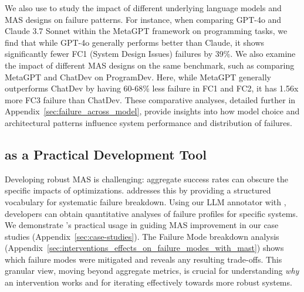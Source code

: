 We also use \dataset{} to study the impact of different underlying language models and MAS designs on failure patterns. For instance, when comparing GPT-4o and Claude 3.7 Sonnet within the MetaGPT framework on programming tasks, we find that while GPT-4o generally performs better than Claude, it shows significantly fewer FC1 (System Design Issues) failures by 39\%. We also examine the impact of different MAS designs on the same benchmark, such as comparing MetaGPT and ChatDev on ProgramDev. Here, while MetaGPT generally outperforms ChatDev by having 60-68\% less failure in FC1 and FC2, it has 1.56x more FC3 failure than ChatDev. These comparative analyses, detailed further in Appendix~\ref{sec:failure_across_model}, provide insights into how model choice and architectural patterns influence system performance and distribution of failures.

\subsection{\taxonomy{} as a Practical Development Tool}
\label{sec:mast-utility}

Developing robust MAS is challenging: aggregate success rates can obscure the specific impacts of optimizations. \taxonomy{} addresses this by providing a structured vocabulary for systematic failure breakdown. Using our LLM annotator with \taxonomy{}, developers can obtain quantitative analyses of failure profiles for specific systems. We demonstrate \taxonomy{}'s practical usage in guiding MAS improvement in our case studies (Appendix~\ref{sec:case-studies}). The Failure Mode breakdown analysis (Appendix~\ref{sec:interventions_effects_on_failure_modes_with_mast}) shows which failure modes were mitigated and reveals any resulting trade-offs. This granular view, moving beyond aggregate metrics, is crucial for understanding \textit{why} an intervention works and for iterating effectively towards more robust systems.


